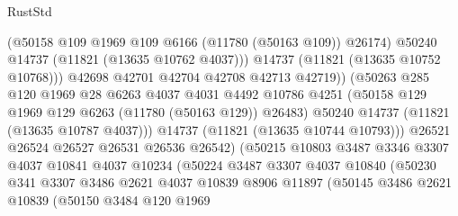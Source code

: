\begin{lexlean}{RustStd}
\begin{coremodule}
                                    (@50158 @109 @1969 @109 @6166 (@11780 (@50163 @109)) @26174)
                                    @50240
                                    @14737
                                    (@11821 (@13635 @10762 @4037)))
                                  @14737
                                  (@11821 (@13635 @10752 @10768)))
                                @42698
                                @42701
                                @42704
                                @42708
                                @42713
                                @42719))
                            (@50263
                              @285
                              @120
                              @1969
                              @28
                              @6263
                              @4037
                              @4031
                              @4492
                              @10786
                              @4251
                              (@50158 @129 @1969 @129 @6263 (@11780 (@50163 @129)) @26483)
                              @50240
                              @14737
                              (@11821 (@13635 @10787 @4037)))
                            @14737
                            (@11821 (@13635 @10744 @10793)))
                          @26521
                          @26524
                          @26527
                          @26531
                          @26536
                          @26542)
                        (@50215
                          @10803
                          @3487
                          @3346
                          @3307
                          @4037
                          @10841
                          @4037
                          @10234
                          (@50224
                            @3487
                            @3307
                            @4037
                            @10840
                            (@50230
                              @341
                              @3307
                              @3486
                              @2621
                              @4037
                              @10839
                              @8906
                              @11897
                              (@50145
                                @3486
                                @2621
                                @10839
                                (@50150
                                  @3484
                                  @120
                                  @1969

\end{coremodule}
\end{lexlean}
